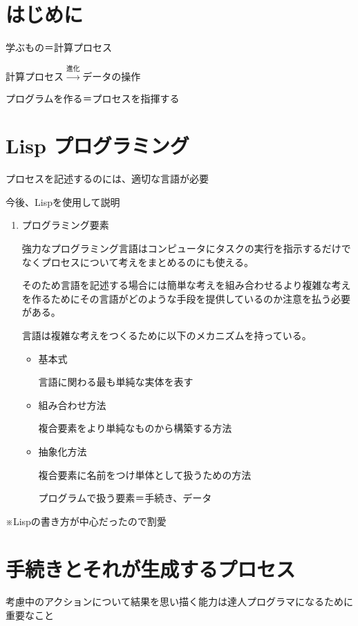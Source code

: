 \documentclass{jsarticle}
\begin{document}
\section{はじめに}
学ぶもの＝計算プロセス

$計算プロセス \xrightarrow{進化} データの操作$

プログラムを作る＝プロセスを指揮する

\section{Lisp プログラミング}

プロセスを記述するのには、適切な言語が必要

今後、Lispを使用して説明

\begin{enumerate}
  \item プログラミング要素

強力なプログラミング言語はコンピュータにタスクの実行を指示するだけでなくプロセスについて考えをまとめるのにも使える。

そのため言語を記述する場合には簡単な考えを組み合わせるより複雑な考えを作るためにその言語がどのような手段を提供しているのか注意を払う必要がある。

言語は複雑な考えをつくるために以下のメカニズムを持っている。
\begin{itemize}
  \item 基本式

言語に関わる最も単純な実体を表す
  \item 組み合わせ方法

複合要素をより単純なものから構築する方法
  \item 抽象化方法

複合要素に名前をつけ単体として扱うための方法

プログラムで扱う要素＝手続き、データ

\end{itemize}
\end{enumerate}

※Lispの書き方が中心だったので割愛

\section{手続きとそれが生成するプロセス}

考慮中のアクションについて結果を思い描く能力は達人プログラマになるために重要なこと
\end{document}

